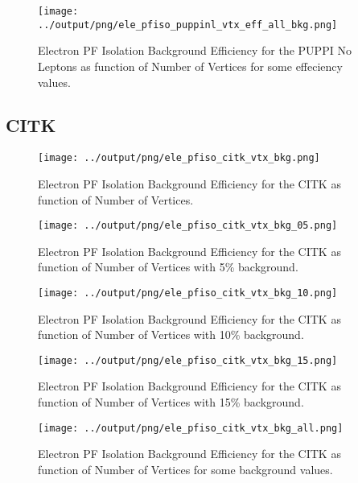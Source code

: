\documentclass[11pt]{book}
\begin{document}
\begin{figure}[htb]
\centering
\texttt{[image: ../output/png/ele\_pfiso\_puppinl\_vtx\_eff\_all\_bkg.png]}
\caption{Electron PF Isolation Background Efficiency for the PUPPI No Leptons as function of Number of Vertices for some effeciency values.}
\label{fig:ele_pfiso_vtx_eff_puppinl_eff_all_bkg}
\end{figure}
\clearpage

\subsection{CITK}
\begin{figure}[htb]
\centering
\texttt{[image: ../output/png/ele\_pfiso\_citk\_vtx\_bkg.png]}
\caption{Electron PF Isolation Background Efficiency for the CITK as function of Number of Vertices.}
\label{fig:ele_pfiso_vtx_bkg_citk}
\end{figure}

\begin{figure}[htb]
\centering
\texttt{[image: ../output/png/ele\_pfiso\_citk\_vtx\_bkg\_05.png]}
\caption{Electron PF Isolation Background Efficiency for the CITK as function of Number of Vertices with 5\% background.}
\label{fig:ele_pfiso_vtx_bkg_citk_bkg_05}
\end{figure}

\begin{figure}[htb]
\centering
\texttt{[image: ../output/png/ele\_pfiso\_citk\_vtx\_bkg\_10.png]}
\caption{Electron PF Isolation Background Efficiency for the CITK as function of Number of Vertices with 10\% background.}
\label{fig:ele_pfiso_vtx_bkg_citk_bkg_10}
\end{figure}

\begin{figure}[htb]
\centering
\texttt{[image: ../output/png/ele\_pfiso\_citk\_vtx\_bkg\_15.png]}
\caption{Electron PF Isolation Background Efficiency for the CITK as function of Number of Vertices with 15\% background.}
\label{fig:ele_pfiso_vtx_bkg_citk_bkg_15}
\end{figure}

\begin{figure}[htb]
\centering
\texttt{[image: ../output/png/ele\_pfiso\_citk\_vtx\_bkg\_all.png]}
\caption{Electron PF Isolation Background Efficiency for the CITK as function of Number of Vertices for some background values.}
\label{fig:ele_pfiso_vtx_bkg_citk_bkg_all}
\end{figure}
\end{document}
